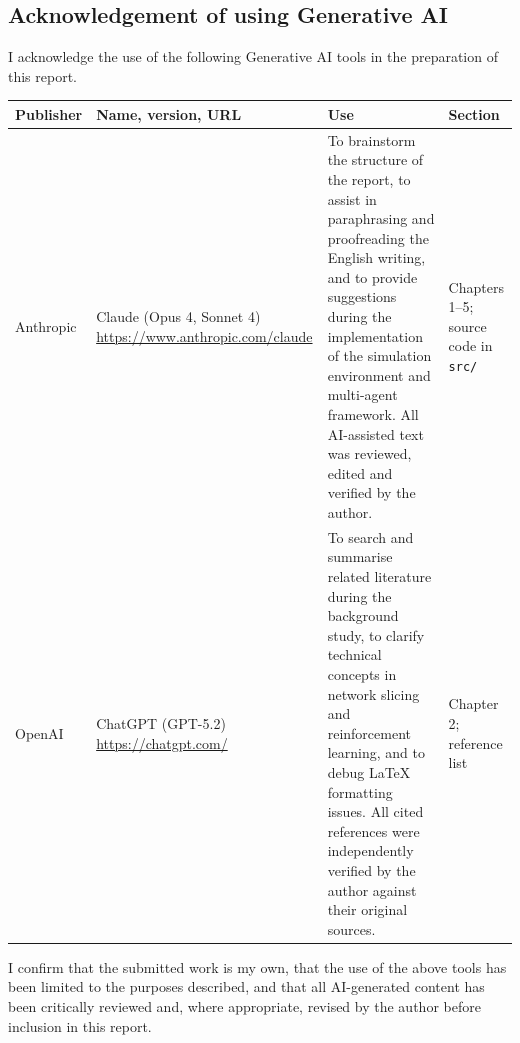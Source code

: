 \subsection*{Acknowledgement of using Generative AI}
{}
\setlength{\tabcolsep}{0.1cm} %


I acknowledge the use of the following Generative AI tools in the preparation of this report.

\begin{table}[h]
    \renewcommand{\arraystretch}{1.3}
    \begin{tabular}{|p{2.1cm}|p{4.1cm}|p{6cm}|p{3.1cm}|}
        \hline
        \textbf{Publisher} & \textbf{Name, version, URL} & \textbf{Use} & \textbf{Section} \\
        \hline
        Anthropic & Claude (Opus 4, Sonnet 4) \newline \url{https://www.anthropic.com/claude} & To brainstorm the structure of the report, to assist in paraphrasing and proofreading the English writing, and to provide suggestions during the implementation of the simulation environment and multi-agent framework. All AI-assisted text was reviewed, edited and verified by the author. & Chapters 1--5; source code in \texttt{src/} \\
        \hline
        OpenAI & ChatGPT (GPT-5.2) \newline \url{https://chatgpt.com/} & To search and summarise related literature during the background study, to clarify technical concepts in network slicing and reinforcement learning, and to debug LaTeX formatting issues. All cited references were independently verified by the author against their original sources. & Chapter 2; reference list \\
        \hline
    \end{tabular}
\end{table}

I confirm that the submitted work is my own, that the use of the above tools has been limited to the purposes described, and that all AI-generated content has been critically reviewed and, where appropriate, revised by the author before inclusion in this report.
